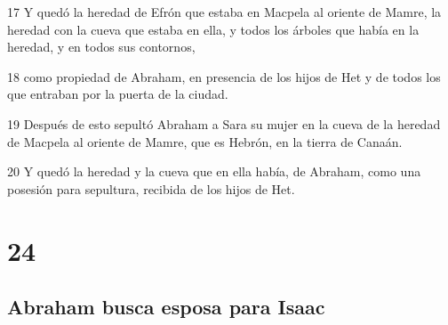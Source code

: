 \par 17 Y quedó la heredad de Efrón que estaba en Macpela al oriente de Mamre, la heredad con la cueva que estaba en ella, y todos los árboles que había en la heredad, y en todos sus contornos,
\par 18 como propiedad de Abraham, en presencia de los hijos de Het y de todos los que entraban por la puerta de la ciudad.
\par 19 Después de esto sepultó Abraham a Sara su mujer en la cueva de la heredad de Macpela al oriente de Mamre, que es Hebrón, en la tierra de Canaán.
\par 20 Y quedó la heredad y la cueva que en ella había, de Abraham, como una posesión para sepultura, recibida de los hijos de Het.

\chapter{24}

\section*{Abraham busca esposa para Isaac}

